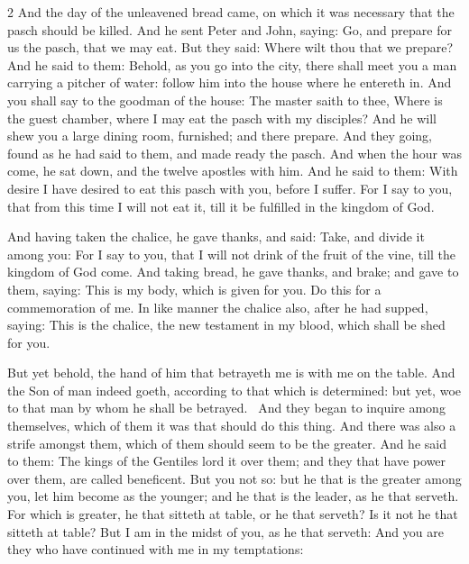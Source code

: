 \begin{multicols}{2}\small
And the day of the unleavened bread came, on which it was necessary that the pasch should be killed. And he sent Peter and John, saying: Go, and prepare for us the pasch, that we may eat. But they said: Where wilt thou that we prepare? And he said to them: Behold, as you go into the city, there shall meet you a man carrying a pitcher of water: follow him into the house where he entereth in. And you shall say to the goodman of the house: The master saith to thee, Where is the guest chamber, where I may eat the pasch with my disciples? And he will shew you a large dining room, furnished; and there prepare. And they going, found as he had said to them, and made ready the pasch. And when the hour was come, he sat down, and the twelve apostles with him. And he said to them: With desire I have desired to eat this pasch with you, before I suffer. For I say to you, that from this time I will not eat it, till it be fulfilled in the kingdom of God.

And having taken the chalice, he gave thanks, and said: Take, and divide it among you: For I say to you, that I will not drink of the fruit of the vine, till the kingdom of God come. And taking bread, he gave thanks, and brake; and gave to them, saying: This is my body, which is given for you. Do this for a commemoration of me. In like manner the chalice also, after he had supped, saying: This is the chalice, the new testament in my blood, which shall be shed for you.

But yet behold, the hand of him that betrayeth me is with me on the table. And the Son of man indeed goeth, according to that which is determined: but yet, woe to that man by whom he shall be betrayed.  And they began to inquire among themselves, which of them it was that should do this thing. And there was also a strife amongst them, which of them should seem to be the greater. And he said to them: The kings of the Gentiles lord it over them; and they that have power over them, are called beneficent. But you not so: but he that is the greater among you, let him become as the younger; and he that is the leader, as he that serveth. For which is greater, he that sitteth at table, or he that serveth? Is it not he that sitteth at table? But I am in the midst of you, as he that serveth: And you are they who have continued with me in my temptations:


\end{multicols}
